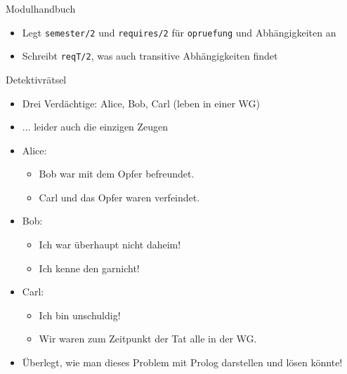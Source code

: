 \documentclass{beamer}
\newcommand{\code}[1]{
	\begin{mdframed}
		
	\end{mdframed}
}
\begin{document}
\begin{frame}{Modulhandbuch}
	\code{demos/modulhandbuch.pl}

	\begin{itemize}
		\item Legt \texttt{semester/2} und \texttt{requires/2} für \texttt{opruefung} und Abhängigkeiten an
		\item Schreibt \texttt{reqT/2}, was auch transitive Abhängigkeiten findet
	\end{itemize}
\end{frame}

\begin{frame}{Detektivrätsel}
	\begin{itemize}
		\item Drei Verdächtige: Alice, Bob, Carl (leben in einer WG)
		\item ... leider auch die einzigen Zeugen
		\item Alice:
		\begin{itemize}
			\item Bob war mit dem Opfer befreundet.
			\item Carl und das Opfer waren verfeindet.
		\end{itemize}
		\item Bob:
		\begin{itemize}
			\item Ich war überhaupt nicht daheim!
			\item Ich kenne den garnicht!
		\end{itemize}
		\item Carl:
		\begin{itemize}
			\item Ich bin unschuldig!
			\item Wir waren zum Zeitpunkt der Tat alle in der WG.
		\end{itemize}
		\vspace{1em}
		\item Überlegt, wie man dieses Problem mit Prolog darstellen und lösen könnte!
	\end{itemize}
\end{frame}
\end{document}
